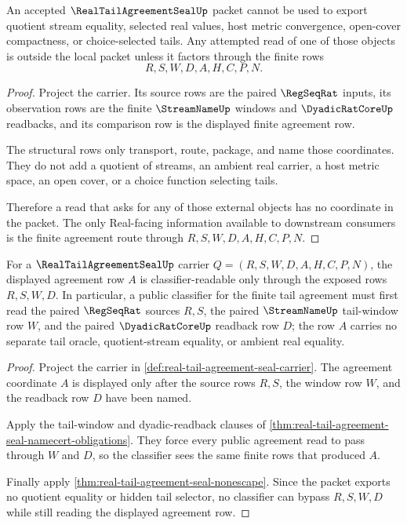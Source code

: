 \begin{theorem}
\label{thm:real-tail-agreement-seal-nonescape}
An accepted $\RealTailAgreementSealUp$ packet cannot be used to export quotient stream equality, selected real values, host metric convergence, open-cover compactness, or choice-selected tails. Any attempted read of one of those objects is outside the local packet unless it factors through the finite rows
$$
R,S,W,D,A,H,C,P,N.
$$
\end{theorem}
\begin{proof}
Project the carrier. Its source rows are the paired $\RegSeqRat$ inputs, its observation rows are the finite $\StreamNameUp$ windows and $\DyadicRatCoreUp$ readbacks, and its comparison row is the displayed finite agreement row.

The structural rows only transport, route, package, and name those coordinates. They do not add a quotient of streams, an ambient real carrier, a host metric space, an open cover, or a choice function selecting tails.

Therefore a read that asks for any of those external objects has no coordinate in the packet. The only Real-facing information available to downstream consumers is the finite agreement route through $R,S,W,D,A,H,C,P,N$.
\end{proof}

\begin{theorem}
\label{thm:real-tail-agreement-seal-tail-classifier}
For a $\RealTailAgreementSealUp$ carrier $Q=(R,S,W,D,A,H,C,P,N)$, the displayed agreement row $A$ is classifier-readable only through the exposed rows $R,S,W,D$. In particular, a public classifier for the finite tail agreement must first read the paired $\RegSeqRat$ sources $R,S$, the paired $\StreamNameUp$ tail-window row $W$, and the paired $\DyadicRatCoreUp$ readback row $D$; the row $A$ carries no separate tail oracle, quotient-stream equality, or ambient real equality.
\end{theorem}
\begin{proof}
Project the carrier in \autoref{def:real-tail-agreement-seal-carrier}. The agreement coordinate $A$ is displayed only after the source rows $R,S$, the window row $W$, and the readback row $D$ have been named.

Apply the tail-window and dyadic-readback clauses of \autoref{thm:real-tail-agreement-seal-namecert-obligations}. They force every public agreement read to pass through $W$ and $D$, so the classifier sees the same finite rows that produced $A$.

Finally apply \autoref{thm:real-tail-agreement-seal-nonescape}. Since the packet exports no quotient equality or hidden tail selector, no classifier can bypass $R,S,W,D$ while still reading the displayed agreement row.
\end{proof}

